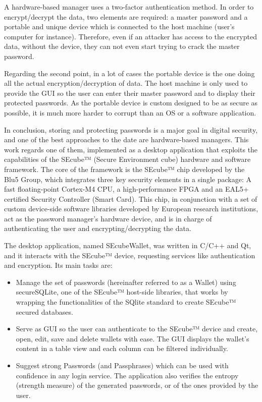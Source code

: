 A hardware-based manager uses a two-factor authentication method. In order to encrypt/decrypt the data, two elements are required: a master password and a portable and unique device which is connected to the host machine (user's computer for instance). Therefore, even if an attacker has access to the encrypted data, without the device, they can not even start trying to crack the master password. 

Regarding the second point, in a lot of cases the portable device is the one doing all the actual encryption/decryption of data. The host machine is only used to provide the GUI so the user can enter their master password and to display their protected passwords. As the portable device is custom designed to be as secure as possible, it is much more harder to corrupt than an OS or a software application.

\vspace{10pt}
In conclusion, storing and protecting passwords is a major goal in digital security, and one of the best approaches to the date are hardware-based managers. This work regards one of them, implemented as a desktop application that exploits the capabilities of the SEcube™ (Secure Environment cube) hardware and software framework. The core of the framework is the SEcube™ chip developed by the Blu5 Group\citep{Blu5}, which integrates three key security elements in a single package: A fast floating-point Cortex-M4 CPU, a high-performance FPGA and an EAL5+ certified Security Controller (Smart Card). This chip, in conjunction with a set of custom device-side software libraries \cite{SEcubeRes} developed by European research institutions, act as the password manager's hardware device, and is in charge of authenticating the user and encrypting/decrypting the data.

The desktop application, named SEcubeWallet, was written in C/C++ and Qt, and it interacts with the SEcube™ device, requesting services like authentication and encryption. Its main tasks are:
\begin{itemize}
\setlength\itemsep{-3pt}
\item Manage the set of passwords (hereinafter referred to as a Wallet) using secureSQLite, one of the SEcube™ host-side libraries, that works by wrapping the functionalities of the SQlite standard to create SEcube™ secured databases.
\item Serve as GUI so the user can authenticate to the SEcube™ device and create, open, edit, save and delete wallets with ease. The GUI displays the wallet's content in a table view and each column can be filtered individually.
\item Suggest strong Passwords (and Passphrases) which can be used with confidence in any login service. The application also verifies the entropy (strength measure) of the generated passwords, or of the ones provided by the user.
\end{itemize}


